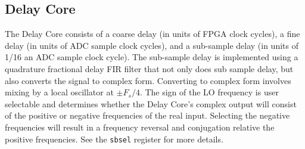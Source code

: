 \documentclass[12pt]{article}
\begin{document}
  \subsection{Delay Core}

The Delay Core consists of a coarse delay (in units of FPGA clock cycles), a
fine delay (in units of ADC sample clock cycles), and a sub-sample delay (in
units of 1/16 an ADC sample clock cycle).  The sub-sample delay is implemented
using a quadrature fractional delay FIR filter that not only does sub sample
delay, but also converts the signal to complex form.  Converting to complex
form involves mixing by a local oscillator at $\pm F_s/4$.  The sign of the LO
frequency is user selectable and determines whether the Delay Core's complex
output will consist of the positive or negative frequencies of the real input.
Selecting the negative frequencies will result in a frequency reversal and
conjugation relative the positive frequencies.  See the \verb|sbsel| register
for more details.
\end{document}
